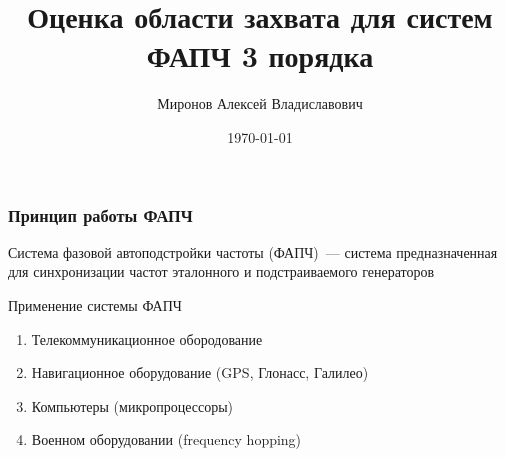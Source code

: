 \documentclass{beamer}
\title[Оценка области захвата для систем]{Оценка области захвата для систем ФАПЧ 3 порядка} %
\author{Миронов Алексей Владиславович} %
\institute[СПБГУ] %
{
Санкт-Петербургский государственный университет\\ %
\vspace{0.7cm}
    Научный руководитель:  д.ф.-м. н., профессор Юлдашев Р. В. \\
    \vspace{0.7cm}
}
\date{\today} %
\begin{document}
\begin{frame}
\titlepage %
\end{frame}


\begin{frame}
\frametitle{Принцип работы ФАПЧ}
\begin{center}
\end{center}
\begin{definition}
Система фазовой автоподстройки частоты (ФАПЧ)~--- система предназначенная для синхронизации частот эталонного и подстраиваемого генераторов
\end{definition}
Применение системы ФАПЧ
\begin{enumerate}
\item Телекоммуникационное обородование
\item Навигационное оборудование (GPS, Глонасс, Галилео)
\item Компьютеры (микропроцессоры)
\item Военном оборудовании (frequency hopping)
\end{enumerate}
\end{frame}
\end{document}
